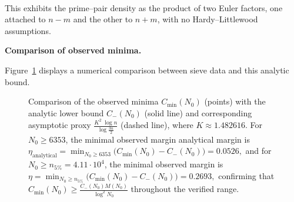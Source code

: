 \documentclass[11pt]{article}
\makeatletter
\theoremstyle{inline}
\theoremstyle{break}
\renewenvironment{proof}[1][\proofname]{%
  \par\pushQED{\qed}%
  \normalfont \topsep6\p@\@plus6\p@\relax
  \trivlist
  \item[\hskip\labelsep
        \itshape
    #1\@addpunct{.}]\mbox{}\\  %
}{%
  \popQED\endtrivlist\@endpefalse
}
\theoremstyle{break}
\theoremstyle{break}
\theoremstyle{break}
\theoremstyle{break}
\theoremstyle{inline}
\newcommand{\xMertens}{6353} %
\newcommand{\xNzeroStat}{71633} %
\newcommand{\xEtaStat}{0.2693} %
\newcommand{\xMinGlobal}{7219}       %
\newcommand{\xDeltaGlobal}{0.0526}   %
\newcommand{\tana}{{\scriptscriptstyle\mathrm{analytical}}}
\newcommand{\Cmeas}{C}              %
\newcommand{\CminusProduct}{C_{-}}
\makeatother
\begin{document}
\begin{proof}
This exhibits the prime--pair density as the product of two Euler factors,
one attached to \(n-m\) and the other to \(n+m\), with no Hardy--Littlewood
assumptions.\cite{HardyLittlewood1923,Vaughan1997} 

\noindent\textbf{Comparison of observed minima.}

Figure~\ref{fig:lower-analytic-bound-comparison} displays
a numerical comparison between sieve data and this analytic bound.

\cpsdata

\begin{figure}[H]
\centering
{}
\caption{Comparison of the observed minima \( C_{\min}(N_0) \) (points) with the analytic lower bound \( \CminusProduct(N_0) \) (solid line)
and corresponding asymptotic proxy \( \tfrac{K^2\;\log{n}}{\log{\frac{3n}{2}}} \) (dashed line), where \( K \approx 1.482616 \).
For \( N_0 \ge \xMertens \), the minimal observed margin analytical margin is
\(\displaystyle 
\eta_{\tana} = \min_{N_0 \ge \xMertens} \bigl( C_{\min}(N_0) - \CminusProduct(N_0) ) = \xDeltaGlobal,
\)
and for \( N_0 \ge n_{5\%} = 4.11 \cdot 10^{4} \), the minimal observed margin is
\(\displaystyle 
\eta = \min_{N_0 \ge n_{5\%}} \bigl( C_{\min}(N_0) - \CminusProduct(N_0) ) = \xEtaStat,
\)
confirming that \( \Cmeas_{\min}(N_0) \ge \tfrac{\CminusProduct(N_0) M(N_0)}{\log^2{N_0}} \) throughout the verified range.}
\label{fig:lower-analytic-bound-comparison}
\end{figure}



\end{proof}
\end{document}
